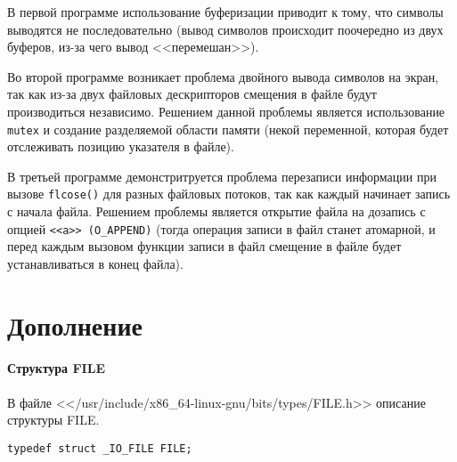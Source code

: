 В первой программе использование буферизации приводит к тому, что символы выводятся не последовательно (вывод символов происходит поочередно из двух буферов, из-за чего вывод <<перемешан>>).

Во второй программе возникает проблема двойного вывода символов на экран, так как из-за двух файловых дескрипторов смещения в файле будут производиться независимо. Решением данной проблемы является использование \texttt{mutex} и создание разделяемой области памяти (некой переменной, которая будет отслеживать позицию указателя в файле).

В третьей программе демонстритруется проблема перезаписи информации при вызове \texttt{flcose()} для разных файловых потоков, так как каждый начинает запись с начала файла. Решением проблемы является открытие файла на дозапись с опцией \texttt{<<a>> (O\_APPEND)} (тогда операция записи в файл станет атомарной, и перед каждым вызовом функции записи в файл смещение в файле будет устанавливаться в конец файла).


\chapter*{Дополнение}

\subsubsection{Структура FILE}

В файле <</usr/include/x86\_64-linux-gnu/bits/types/FILE.h>> описание структуры FILE.

\begin{lstlisting}
typedef struct _IO_FILE FILE;
\end{lstlisting}

